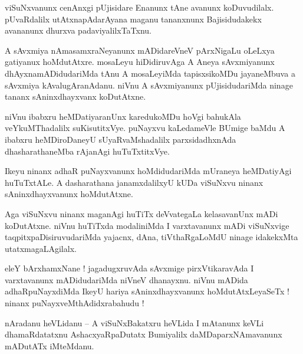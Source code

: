 \documentclass{article}
\begin{document}
\begin{mn}%
viSuNxvanunx cenAnxgi pUjisidare Enanunx tAne avanunx koDuvudilalx. pUvaRdalilx utAtxnapAdarAyana 
maganu tananxnunx Bajisidudakekx avananunx dhurxva padaviyalilxTaTxnu.
\end{mn}

\begin{mn}%
A sAvxmiya nAmasamxraNeyanunx mADidareVneV pArxNigaLu oLeLxya gatiyanux hoMdutAtxre. mosaLeyu 
hiDidiruvAga A Aneya sAvxmiyanunx dhAyxnamADidudariMda tAnu A mosaLeyiMda tapisxsikoMDu jayaneMbuva 
a sAvxmiya kAvalugAranAdanu. niVnu A sAvxmiyanunx pUjisidudariMda ninage tananx 
sAninxdhayxvanx koDutAtxne.
\end{mn}

\begin{mn}%
niVnu ibabxru heMDatiyaranUnx karedukoMDu hoVgi bahukAla veYkuMThadalilx suKisutitxVye. puNayxvu 
kaLedameVle BUmige baMdu A ibabxru heMDiroDaneyU sUyaRvaMshadalilx parxsidadhxnAda 
dhasharathaneMba rAjanAgi huTuTxtitxVye.
\end{mn}

\begin{mn}%
Ikeyu ninanx adhaR puNayxvanunx hoMdidudariMda mUraneya heMDatiyAgi huTuTxtALe. A dasharathana 
janamxdalilxyU kUDa viSuNxvu ninanx sAninxdhayxvanunx hoMdutAtxne.
\end{mn}

\begin{mn}%
Aga viSuNxvu ninanx maganAgi huTiTx deVvategaLa kelasavanUnx mADi koDutAtxne. niVnu huTiTxda 
modaliniMda I varxtavanunx mADi viSuNxvige taqpitxpaDisiruvudariMda yajacnx, dAna, tiVthaRgaLoMdU 
ninage idakekxMta utatxmagaLAgilalx.
\end{mn}

\begin{mn}%
eleY bArxhamxNane ! jagadugxruvAda sAvxmige pirxVtikaravAda I varxtavanunx mADidudariMda niVneV 
dhanayxnu. niVnu mADida adhaRpuNayxdiMda IkeyU hariya sAninxdhayxvanunx hoMdutAtxLeyaSeTx ! 
ninanx puNayxveMthAdidxrabahudu !
\end{mn}


\begin{mn}%
nAradanu heVLidanu -- A viSuNxBakatxru heVLida I mAtanunx keVLi dhamaRdatatxnu AshacxyaRpaDutatx 
Bumiyalilx daMDaparxNAmavanunx mADutATx iMteMdanu.
\end{mn}
\end{document}
